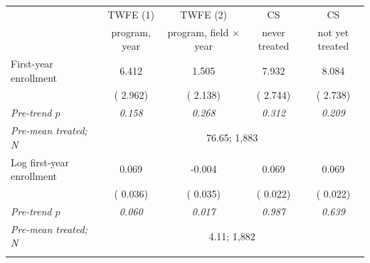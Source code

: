 \begin{tabular}{lcccc}
\toprule
 & TWFE (1) & TWFE (2) & CS & CS \\
 & program, year & program, field \(\times\) year & never treated & not yet treated \\
\midrule
First-year enrollment &   6.412\sym{**} &   1.505 &   7.932\sym{***} &   8.084\sym{***} \\
 & ( 2.962) & ( 2.138) & ( 2.744) & ( 2.738) \\
\quad \textit{Pre-trend \(p\)} & \textit{0.158} & \textit{0.268} & \textit{0.312} & \textit{0.209} \\
\quad \textit{Pre-mean treated; N} & \multicolumn{4}{c}{\scriptsize   76.65;  1,883} \\
\addlinespace
Log first-year enrollment &   0.069\sym{*} &  -0.004 &   0.069\sym{***} &   0.069\sym{***} \\
 & ( 0.036) & ( 0.035) & ( 0.022) & ( 0.022) \\
\quad \textit{Pre-trend \(p\)} & \textit{0.060} & \textit{0.017} & \textit{0.987} & \textit{0.639} \\
\quad \textit{Pre-mean treated; N} & \multicolumn{4}{c}{\scriptsize    4.11;  1,882} \\
\addlinespace
\bottomrule
\end{tabular}
